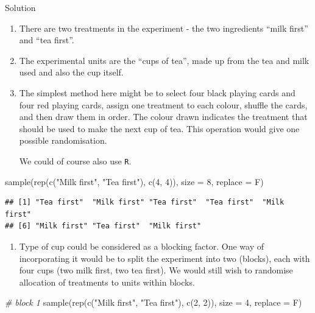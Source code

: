 \documentclass[
]{book}
\newenvironment{Shaded}{\begin{snugshade}}{\end{snugshade}}
\newcommand{\AttributeTok}[1]{\textcolor[rgb]{0.77,0.63,0.00}{#1}}
\newcommand{\CommentTok}[1]{\textcolor[rgb]{0.56,0.35,0.01}{\textit{#1}}}
\newcommand{\DecValTok}[1]{\textcolor[rgb]{0.00,0.00,0.81}{#1}}
\newcommand{\FunctionTok}[1]{\textcolor[rgb]{0.00,0.00,0.00}{#1}}
\newcommand{\NormalTok}[1]{#1}
\newcommand{\StringTok}[1]{\textcolor[rgb]{0.31,0.60,0.02}{#1}}
\providecommand{\tightlist}{%
  \setlength{\itemsep}{0pt}\setlength{\parskip}{0pt}}
\theoremstyle{definition}
\theoremstyle{definition}
\theoremstyle{definition}
\theoremstyle{definition}
\theoremstyle{remark}
\begin{document}
Solution

\begin{enumerate}
\def\labelenumi{\alph{enumi}.}
\item
  There are two treatments in the experiment - the two ingredients ``milk first'' and ``tea first''.
\item
  The experimental units are the ``cups of tea'', made up from the tea and milk used and also the cup itself.
\item
  The simplest method here might be to select four black playing cards and four red playing cards, assign one treatment to each colour, shuffle the cards, and then draw them in order. The colour drawn indicates the treatment that should be used to make the next cup of tea. This operation would give one possible randomisation.

  We could of course also use \texttt{R}.
\end{enumerate}

\begin{Shaded}
\begin{Highlighting}[]
\FunctionTok{sample}\NormalTok{(}\FunctionTok{rep}\NormalTok{(}\FunctionTok{c}\NormalTok{(}\StringTok{"Milk first"}\NormalTok{, }\StringTok{"Tea first"}\NormalTok{), }\FunctionTok{c}\NormalTok{(}\DecValTok{4}\NormalTok{, }\DecValTok{4}\NormalTok{)), }\AttributeTok{size =} \DecValTok{8}\NormalTok{, }\AttributeTok{replace =}\NormalTok{ F)}
\end{Highlighting}
\end{Shaded}

\begin{verbatim}
## [1] "Tea first"  "Milk first" "Tea first"  "Tea first"  "Milk first"
## [6] "Milk first" "Tea first"  "Milk first"
\end{verbatim}

\begin{enumerate}
\def\labelenumi{\alph{enumi}.}
\setcounter{enumi}{3}
\tightlist
\item
  Type of cup could be considered as a blocking factor. One way of incorporating it would be to split the experiment into two (blocks), each with four cups (two milk first, two tea first). We would still wish to randomise allocation of treatments to units within blocks.
\end{enumerate}

\begin{Shaded}
\begin{Highlighting}[]
    \CommentTok{\# block 1}
    \FunctionTok{sample}\NormalTok{(}\FunctionTok{rep}\NormalTok{(}\FunctionTok{c}\NormalTok{(}\StringTok{"Milk first"}\NormalTok{, }\StringTok{"Tea first"}\NormalTok{), }\FunctionTok{c}\NormalTok{(}\DecValTok{2}\NormalTok{, }\DecValTok{2}\NormalTok{)), }\AttributeTok{size =} \DecValTok{4}\NormalTok{, }\AttributeTok{replace =}\NormalTok{ F)}
\end{Highlighting}
\end{Shaded}
\end{document}

